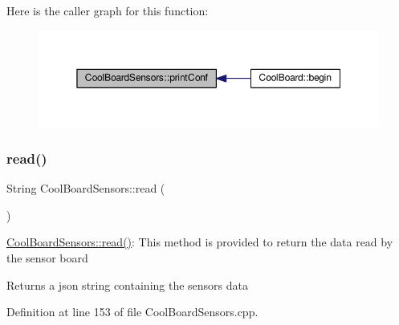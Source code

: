Here is the caller graph for this function\+:\nopagebreak
\begin{figure}[H]
\begin{center}
\leavevmode
\includegraphics[width=350pt]{de/d46/class_cool_board_sensors_af6fd79505815b204c178617ecf54c873_icgraph}
\end{center}
\end{figure}
\mbox{\label{class_cool_board_sensors_a91badb2539d91fda8679f2a597874c48}} 
\subsubsection{\texorpdfstring{read()}{read()}}
{\footnotesize\ttfamily String Cool\+Board\+Sensors\+::read (\begin{DoxyParamCaption}{ }\end{DoxyParamCaption})}

\hyperlink{class_cool_board_sensors_a91badb2539d91fda8679f2a597874c48}{Cool\+Board\+Sensors\+::read()}\+: This method is provided to return the data read by the sensor board

\begin{DoxyReturn}{Returns}
a json string containing the sensors data 
\end{DoxyReturn}


Definition at line 153 of file Cool\+Board\+Sensors.\+cpp.


